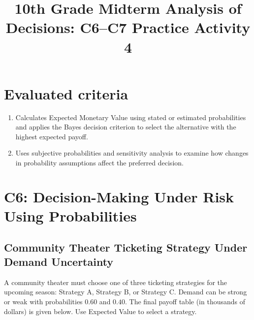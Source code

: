 \makeatletter
{}
\makeatother



\title{10th Grade Midterm Analysis of Decisions: C6--C7 Practice Activity 4}
\author{}
\date{}


\maketitle

\setcounter{tocdepth}{1}
\setcounter{secnumdepth}{2}
\label{toc}
\tableofcontents

\section*{Evaluated criteria}
    \begin{enumerate}[label=\textbf{C\arabic*}, start=6]
        \item Calculates Expected Monetary Value using stated or estimated probabilities and applies the Bayes decision criterion to select the alternative with the highest expected payoff.
        \item Uses subjective probabilities and sensitivity analysis to examine how changes in probability assumptions affect the preferred decision.
    \end{enumerate}


\section{C6: Decision-Making Under Risk Using Probabilities}
\label{sec:c6-decision-making-under-risk}


\subsection{Community Theater Ticketing Strategy Under Demand Uncertainty}
\label{sec:community-theater-ticketing}
    A community theater must choose one of three ticketing strategies for the upcoming season: Strategy A, Strategy B,
    or Strategy C. Demand can be strong or weak with probabilities $0.60$ and $0.40$. The final payoff table (in thousands of dollars)
    is given below. Use Expected Value to select a strategy.

